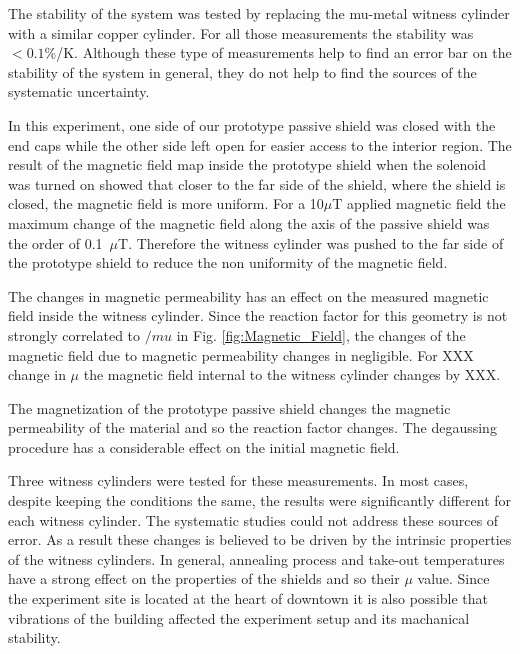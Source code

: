 The stability of the system was tested by replacing the mu-metal
witness cylinder with a similar copper cylinder. For all those
measurements the stability was $<0.1$\%/K. Although these type of
measurements help to find an error bar on the stability of the system
in general, they do not help to find the sources of the systematic
uncertainty.


In this experiment, one side of our prototype passive shield was
closed with the end caps while the other side left open for easier
access to the interior region. The result of the magnetic field map
inside the prototype shield when the solenoid was turned on showed
that closer to the far side of the shield, where the shield is closed,
the magnetic field is more uniform. For a 10$\mu$T applied magnetic
field the maximum change of the magnetic field along the axis of the
passive shield was the order of 0.1~$\mu$T.  Therefore the witness
cylinder was pushed to the far side of the prototype shield to reduce
the non uniformity of the magnetic field.

The changes in magnetic permeability has an effect on the measured
magnetic field inside the witness cylinder. Since the reaction factor
for this geometry is not strongly correlated to $/mu$ in
Fig. \ref{fig:Magnetic_Field}, the changes of the magnetic field due
to magnetic permeability changes in negligible. For XXX change in
$\mu$ the magnetic field internal to the witness cylinder changes by
XXX.

The magnetization of the prototype passive shield changes the magnetic
permeability of the material and so the reaction factor changes. The
degaussing procedure has a considerable effect on the initial magnetic
field.

Three witness cylinders were tested for these measurements. In most
cases, despite keeping the conditions the same, the results were
significantly different for each witness cylinder. The systematic
studies could not address these sources of error. As a result these
changes is believed to be driven by the intrinsic properties of the
witness cylinders.  In general, annealing process and take-out
temperatures have a strong effect on the properties of the shields and
so their $\mu$ value.
Since the experiment site is located at the heart of downtown it is
also possible that vibrations of the building affected the experiment
setup and its machanical stability.

